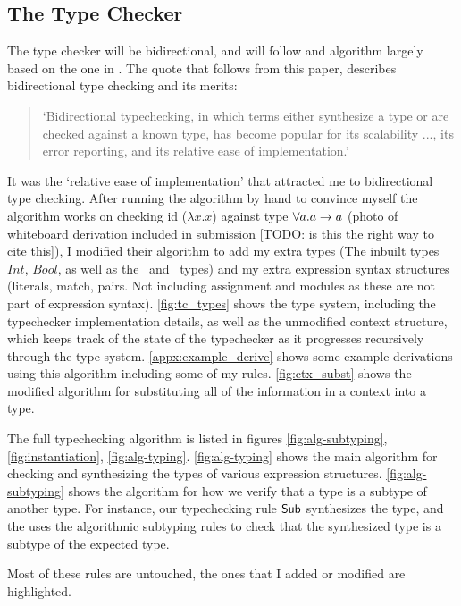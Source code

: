 \subsection{The Type Checker}
The type checker will be bidirectional, and will follow and algorithm largely based on the one in \cite{completebidir}. The quote that follows from this paper, describes bidirectional type checking and its merits:
\begin{quote}
`Bidirectional typechecking, in which terms either synthesize a type or are checked against a known type, has become popular for its scalability ..., its error reporting, and its relative ease of implementation.'\cite{completebidir}
\end{quote}
\noindent It was the `relative ease of implementation' that attracted me to bidirectional type checking. After running the algorithm by hand to convince myself the algorithm works on checking id ($\lambda x. x$) against type $\forall a.a\rightarrow a$ (photo of whiteboard derivation included in submission [TODO: is this the right way to cite this]), I modified their algorithm to add my extra types (The inbuilt types $Int$, $Bool$, as well as the \Uniontype\ and \Producttype\ types) and my extra expression syntax structures (literals, match, pairs. Not including assignment and modules as these are not part of expression syntax). \ref{fig:tc_types} shows the type system, including the typechecker implementation details, as well as the unmodified context structure, which keeps track of the state of the typechecker as it progresses recursively through the type system. \ref{appx:example_derive} shows some example derivations using this algorithm including some of my rules. \ref{fig:ctx_subst} shows the modified algorithm for substituting all of the information in a context into a type. 



The full typechecking algorithm is listed in figures \ref{fig:alg-subtyping}, \ref{fig:instantiation}, \ref{fig:alg-typing}. \ref{fig:alg-typing} shows the main algorithm for checking and synthesizing the types of various expression structures. \ref{fig:alg-subtyping} shows the algorithm for how we verify that a type is a subtype of another type. For instance, our typechecking rule $\text{\normalfont\textsf{Sub}}$ synthesizes the type, and the uses the algorithmic subtyping rules to check that the synthesized type is a subtype of the expected type. 

Most of these rules are untouched, the ones that I added or modified are \colorbox{myTcRuleColour}{highlighted}.


